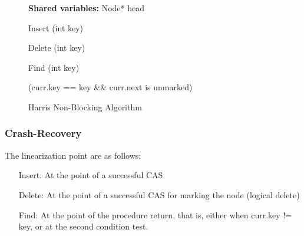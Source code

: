 \begin{figure}
	
	\textbf{Shared variables:} Node* head

	\begin{procedure}[H]
		\caption{Insert (int key)}
		
		
		
	\end{procedure}


	\begin{procedure}[H]
		\caption{Delete (int key)}
		
		
		
	\end{procedure}
	
	\begin{procedure}[H]
		\caption{Find (int key)}
		
		
		\KwRet (curr.key == key $\&\&$ curr.next is unmarked)\;
		
	\end{procedure}
	
	\caption{Harris Non-Blocking Algorithm}
	\label{Harris original}
\end{figure}

\newpage
\subsubsection{Crash-Recovery}

The linearization point are as follows:
\begin{itemize}
	\item [Insert:] At the point of a successful CAS
	\item [Delete:] At the point of a successful CAS for marking the node (logical delete)
	\item [Find:] At the point of the procedure return, that is, either when curr.key != key, or at the second condition test.
\end{itemize}

